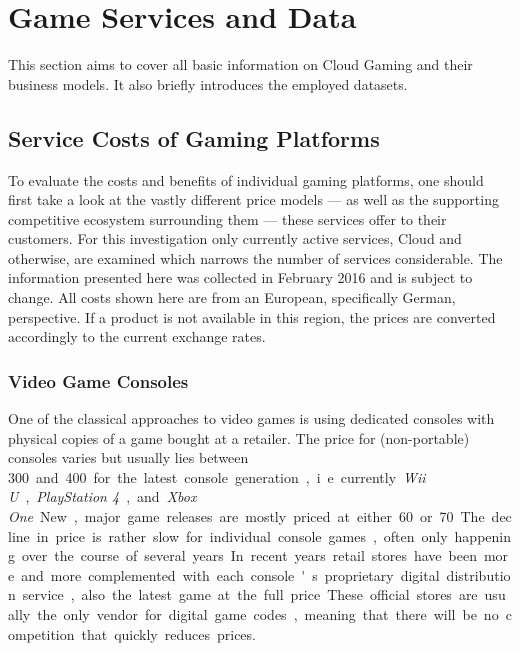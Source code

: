 \section{Game Services and Data}
\label{sec:background}

This section aims to cover all basic information on Cloud Gaming and their business models. It also briefly introduces the employed datasets.

\subsection{Service Costs of Gaming Platforms}

To evaluate the costs and benefits of individual gaming platforms, one should first take a look at the vastly different price models --- as well as the supporting competitive ecosystem surrounding them --- these services offer to their customers. For this investigation only currently active services, Cloud and otherwise, are examined which narrows the number of services considerable. The information presented here was collected in February 2016 and is subject to change. All costs shown here are from an European, specifically German, perspective. If a product is not available in this region, the prices are converted accordingly to the current exchange rates.


\subsubsection{Video Game Consoles}

One of the classical approaches to video games is using dedicated consoles with physical copies of a game bought at a retailer. The price for (non-portable) consoles varies but usually lies between \SI{300}[\EUR] and \SI{400}[\EUR] for the latest console generation, i.e. currently \textit{Wii U}, \textit{PlayStation 4}, and \textit{Xbox One}. New, major game releases are mostly priced at either \SI{60}[\EUR] or \SI{70}[\EUR]. The decline in price is rather slow for individual console games, often only happening over the course of several years.

In recent years retail stores have been more and more complemented with each console's proprietary digital distribution service, also the latest game at the full price. These official stores are usually the only vendor for digital game codes, meaning that there will be no competition that quickly reduces prices.

